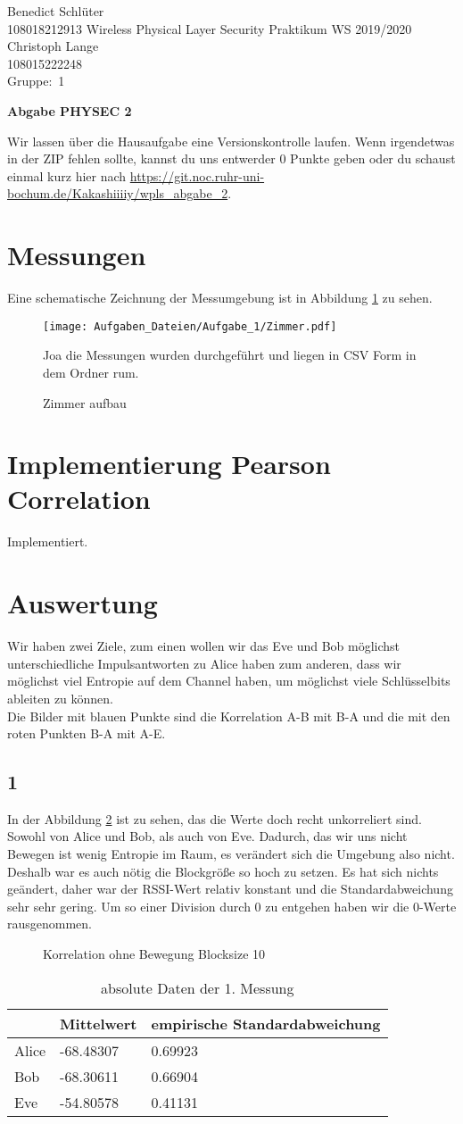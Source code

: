 \documentclass[12pt,a4paper]{article}
\newcommand{\student}{Benedict Schlüter\\ 108018212913 } %
\newcommand{\partner}{Christoph Lange\\ 108015222248} %
\newcommand{\group}{1} %
\newcommand{\hwheadtwo}{$ $
  \vspace{-2cm}
  
\noindent \student \qquad \qquad  Wireless Physical Layer Security Praktikum \hfill WS 2019/2020 \\
\noindent \partner \\
\noindent Gruppe:~\group\\
$ $

  
\begin{center}    
{\Large \bf Abgabe PHYSEC 2}
\end{center}
}
\begin{document}
\hwheadtwo
Wir lassen über die Hausaufgabe eine Versionskontrolle laufen. Wenn irgendetwas in der ZIP fehlen sollte, kannst du uns entwerder 0 Punkte geben oder du schaust einmal kurz hier nach \url{https://git.noc.ruhr-uni-bochum.de/Kakashiiiiy/wpls_abgabe_2}.
\section{Messungen}
Eine schematische Zeichnung der Messumgebung ist in Abbildung \ref{fig:1_1} zu sehen.
\begin{figure}[H]
\centering
\texttt{[image: Aufgaben\_Dateien/Aufgabe\_1/Zimmer.pdf]} 
\caption{Zimmer aufbau}
\label{fig:1_1}
Joa die Messungen wurden durchgeführt und liegen in CSV Form in dem Ordner rum.
\end{figure}
\section{Implementierung Pearson Correlation}
Implementiert.
\section{Auswertung}
Wir haben zwei Ziele, zum einen wollen wir das Eve und Bob möglichst unterschiedliche Impulsantworten zu Alice haben zum anderen, dass wir möglichst viel Entropie auf dem Channel haben, um möglichst viele Schlüsselbits ableiten zu können.\\
Die Bilder mit blauen Punkte sind die Korrelation A-B mit B-A und die mit den roten Punkten B-A mit A-E.
\subsection*{1}
In der Abbildung \ref{fig:1} ist zu sehen, das die Werte doch recht unkorreliert sind. Sowohl von Alice und Bob, als auch von Eve. Dadurch, das wir uns nicht Bewegen ist wenig Entropie im Raum, es verändert sich die Umgebung also nicht. Deshalb war es auch nötig die Blockgröße so hoch zu setzen. Es hat sich nichts geändert, daher war der RSSI-Wert relativ konstant und die Standardabweichung sehr sehr gering. Um so einer Division durch 0 zu entgehen haben wir die 0-Werte rausgenommen.
\begin{figure}[H]
\centering
{} \qquad
{}
\caption{Korrelation ohne Bewegung Blocksize 10}
\label{fig:1}
\end{figure}
\begin{table}[H]
\centering
\begin{tabular}{l|l|l}
& Mittelwert & empirische Standardabweichung \\
\hline
Alice & -68.48307 & 0.69923 \\
\hline
Bob & -68.30611 & 0.66904 \\
\hline
Eve & -54.80578 & 0.41131 \\
\end{tabular}
\caption{absolute Daten der 1. Messung}
\end{table}
\end{document}
